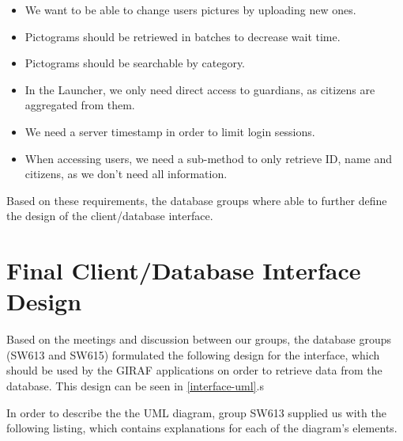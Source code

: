 \begin{itemize}
  \item We want to be able to change users pictures by uploading new ones.
  \item Pictograms should be retriewed in batches to decrease wait time.
  \item Pictograms should be searchable by category.
  \item In the Launcher, we only need direct access to guardians, as citizens
  are aggregated from them.
  \item We need a server timestamp in order to limit login sessions.
  \item When accessing users, we need a sub-method to only retrieve ID, name and
  citizens, as we don't need all information.
\end{itemize}

Based on these requirements, the database groups where able to further define
the design of the client/database interface.

\section{Final Client/Database Interface Design}
Based on the meetings and discussion between our groups, the database groups
(SW613 and SW615) formulated the following design for the interface, which
should be used by the GIRAF applications on order to retrieve data from the
database. This design can be seen in \autoref{interface-uml}.s


In order to describe the the UML diagram, group SW613 supplied us with the
following listing, which contains explanations for each of the diagram's
elements.


